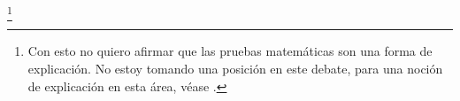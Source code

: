 \footnote{Con esto no quiero afirmar que las pruebas matemáticas son una forma de explicación. No estoy tomando una posición en este debate, para una noción de explicación en esta área, véase \cite{Lange2015}.}








